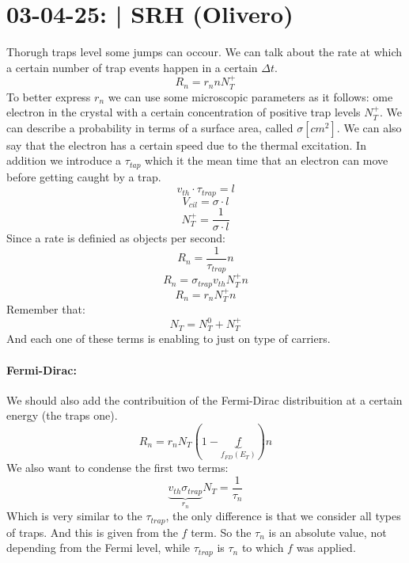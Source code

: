 \section{03-04-25: | SRH (Olivero)}

Thorugh traps level some jumps can occour. We can talk about the rate at which a certain number of trap events happen in a certain $\Delta t$.
\begin{equation}
    R_n = r_nnN_T^+
\end{equation}
To better express $r_n$ we can use some microscopic parameters as it follows: ome electron in the crystal with a certain concentration of positive trap levels $N_T^+$.
We can describe a probability in terms of a surface area, called $\sigma [cm^2]$. We can also say that the electron has a certain speed due to the thermal excitation. In addition we introduce a $\tau_{tap}$ which it the mean time that an electron can move before getting caught by a trap.
\begin{equation}
    v_{th} \cdot \tau_{trap} = l
\end{equation}
\begin{equation}
    V_{cil} = \sigma \cdot l
\end{equation}
\begin{equation}
    N_T^+ = \frac{1}{\sigma \cdot l}
\end{equation}
Since a rate is definied as objects per second:
\begin{equation}
    R_n = \frac{1}{\tau_{trap}}n
\end{equation}
\begin{equation}
    R_n = \sigma_{trap} v_{th} N_T^+ n
\end{equation}
\begin{equation}
    R_n = r_n N_T^+ n
\end{equation}
Remember that:
\begin{equation}
    N_T = N_T^0 + N_T^+
\end{equation}
And each one of these terms is enabling to just on type of carriers. 

\paragraph{Fermi-Dirac:} We should also add the contribuition of the Fermi-Dirac distribuition at a certain energy (the traps one).
\begin{equation}
    R_n = r_n N_T (1-\underbrace{f}_{f_{FD}(E_T)}) n
\end{equation}
We also want to condense the first two terms:
\begin{equation}
    \underbrace{v_{th}\sigma_{trap}}_{r_n}N_T = \frac{1}{\tau_n}
\end{equation}
Which is very similar to the $\tau_{trap}$, the only difference is that we consider all types of traps. And this is given from the $f$ term.
So the $\tau_{n}$ is an absolute value, not depending from the Fermi level, while $\tau_{trap}$ is $\tau_{n}$ to which $f$ was applied.

